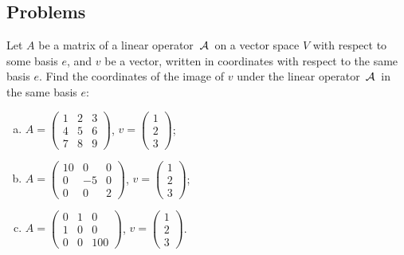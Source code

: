 \subsection{Problems}

\begin{problem}
Let $A$ be a matrix of a linear operator $\,\mathcal{A}\,$ on a vector space $V$ with respect to some basis $e$, and $v$ be a vector, written in coordinates with respect to the same basis $e$. Find the coordinates of the image of $v$ under the linear operator $\,\mathcal{A}\,$ in the same basis $e$:
\begin{enumerate}[a) ]
    \item $A = \begin{pmatrix} 1 & 2 & 3 \\ 4 & 5 & 6 \\ 7 & 8 & 9 \end{pmatrix}$, $v = \begin{pmatrix} 1 \\ 2 \\ 3 \end{pmatrix}$;
    \item $A = \begin{pmatrix} 10 & 0 & 0 \\ 0 & -5 & 0 \\ 0 & 0 & 2 \end{pmatrix}$, $v = \begin{pmatrix} 1 \\ 2 \\ 3 \end{pmatrix}$;
    \item $A = \begin{pmatrix} 0 & 1 & 0 \\ 1 & 0 & 0 \\ 0 & 0 & 100 \end{pmatrix}$, $v = \begin{pmatrix} 1 \\ 2 \\ 3 \end{pmatrix}$.
\end{enumerate}
\end{problem}

